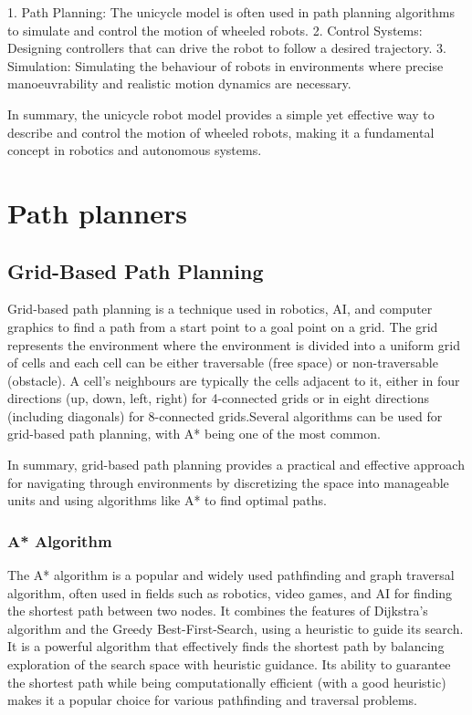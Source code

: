 \documentclass[9pt,a4paper,twoside]{rho-class/rho}
\begin{document}
       1. Path Planning: The unicycle model is often used in path planning algorithms to simulate and control the motion of wheeled robots.
       2. Control Systems: Designing controllers that can drive the robot to follow a desired trajectory.
       3. Simulation: Simulating the behaviour of robots in environments where precise manoeuvrability and realistic motion dynamics are necessary.
       
       In summary, the unicycle robot model provides a simple yet effective way to describe and control the motion of wheeled robots, making it a fundamental concept in robotics and autonomous systems.

       \section{Path planners}

            \subsection{Grid-Based Path Planning}
            Grid-based path planning is a technique used in robotics, AI, and computer graphics to find a path from a start point to a goal point on a grid. The grid represents the environment where the environment is divided into a uniform grid of cells and each cell can be either traversable (free space) or non-traversable (obstacle). A cell's neighbours are typically the cells adjacent to it, either in four directions (up, down, left, right) for 4-connected grids or in eight directions (including diagonals) for 8-connected grids.Several algorithms can be used for grid-based path planning, with A* being one of the most common. 
            
            In summary, grid-based path planning provides a practical and effective approach for navigating through environments by discretizing the space into manageable units and using algorithms like A* to find optimal paths.

            \subsubsection{A* Algorithm}
            The A*  algorithm is a popular and widely used pathfinding and graph traversal algorithm, often used in fields such as robotics, video games, and AI for finding the shortest path between two nodes. It combines the features of Dijkstra's algorithm and the Greedy Best-First-Search, using a heuristic to guide its search. It is a powerful algorithm that effectively finds the shortest path by balancing exploration of the search space with heuristic guidance. Its ability to guarantee the shortest path while being computationally efficient (with a good heuristic) makes it a popular choice for various pathfinding and traversal problems.
\end{document}
